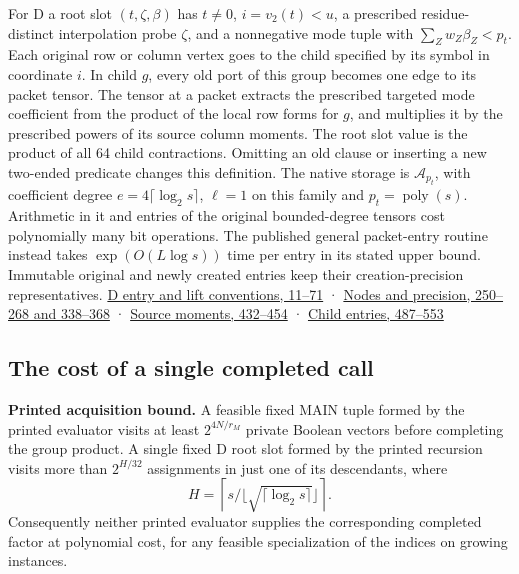 \documentclass[11pt,a4paper]{article}
\begin{document}
For D a root slot \((t,\zeta,\beta)\) has \(t\ne0\), \(i=v_2(t)<u\), a
prescribed residue-distinct interpolation probe \(\zeta\), and a
nonnegative mode tuple with \(\sum_Z w_Z\beta_Z<p_t\). Each original row
or column vertex goes to the child specified by its symbol in coordinate
\(i\). In child \(g\), every old port of this group becomes one edge to
its packet tensor. The tensor at a packet extracts the prescribed
targeted mode coefficient from the product of the local row forms for
\(g\), and multiplies it by the prescribed powers of its source column
moments. The root slot value is the product of all 64 child
contractions. Omitting an old clause or inserting a new two-ended
predicate changes this definition. The native storage is
\(\mathcal A_{p_t}\), with coefficient degree
\(e=4\lceil\log_2s\rceil\), \(\ell=1\) on this family and
\(p_t=\operatorname{poly}(s)\). Arithmetic in it and entries of the
original bounded-degree tensors cost polynomially many bit operations.
The published general packet-entry routine instead takes
\(\exp(O(L\log s))\) time per entry in its stated upper bound. Immutable
original and newly created entries keep their creation-precision
representatives.
\href{https://github.com/openai/math/blob/main/preprints/The-Exponential-Time-Hypothesis-is-False-October-25-2026/build/quantitative-contraction.tex\#L11}{D
entry and lift conventions, 11--71} ·
\href{https://github.com/openai/math/blob/main/preprints/The-Exponential-Time-Hypothesis-is-False-October-25-2026/build/quantitative-contraction.tex\#L250}{Nodes
and precision, 250--268 and 338--368} ·
\href{https://github.com/openai/math/blob/main/preprints/The-Exponential-Time-Hypothesis-is-False-October-25-2026/build/quantitative-contraction.tex\#L432}{Source
moments, 432--454} ·
\href{https://github.com/openai/math/blob/main/preprints/The-Exponential-Time-Hypothesis-is-False-October-25-2026/build/quantitative-contraction.tex\#L487}{Child
entries, 487--553}

\subsection{The cost of a single completed
call}\label{v8-the-cost-of-a-single-completed-call}

\textbf{Printed acquisition bound.} A feasible fixed MAIN tuple formed
by the printed evaluator visits at least \(2^{4N/r_M}\) private Boolean
vectors before completing the group product. A single fixed D root slot
formed by the printed recursion visits more than \(2^{H/32}\)
assignments in just one of its descendants, where \[
 H=\left\lceil s/\lfloor\sqrt{\lceil\log_2s\rceil}\rfloor\right\rceil.
\] Consequently neither printed evaluator supplies the corresponding
completed factor at polynomial cost, for any feasible specialization of
the indices on growing instances.
\end{document}
